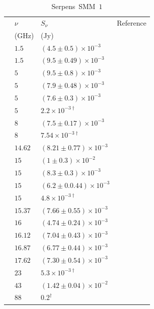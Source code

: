 \documentclass[9pt]{extarticle}   	%
\begin{document}
\begin{table}
\caption{Serpens~SMM~$1$}
\begin{center}
\begin{tabular}{llll}
\hline
 & $\nu$ & $S_\nu$ & Reference\\
 & (GHz) & (Jy) & \\
\hline
 & $1.5$ & $(4.5\pm0.5)\times10^{-3}$ & \citet{1998AJ....115.1693C}\\
 & $1.5$ & $(9.5\pm0.49)\times10^{-3}$ & \citet{1993ApJ...415..191C}\\
 & $5$ & $(9.5\pm0.8)\times10^{-3}$ & \citet{1986ApJ...303..683S}\\
 & $5$ & $(7.9\pm0.48)\times10^{-3}$ & \citet{1989ApJ...346L..85R}\\
 & $5$ & $(7.6\pm0.3)\times10^{-3}$ & \citet{1993ApJ...415..191C}\\
 & $5$ & $2.2\times10^{-3\dag}$ & \citet{1994ApJ...424..222M}\\
 & $8$ & $(7.5\pm0.17)\times10^{-3}$ & \citet{1993ApJ...415..191C}\\
 & $8$ & $7.54\times10^{-3\dag}$ & \citet{2005AJ....130..643E}\\
 & $14.62$ & $(8.21\pm0.77)\times10^{-3}$ & \citet{2012MNRAS.423.1089A}\\
 & $15$ & $(1\pm0.3)\times10^{-2}$ & \citet{1986ApJ...303..683S}\\
 & $15$ & $(8.3\pm0.3)\times10^{-3}$ & \citet{1993ApJ...415..191C}\\
 & $15$ & $(6.2\pm0.0.44)\times10^{-3}$ & \citet{1989ApJ...346L..85R}\\
 & $15$ & $4.8\times10^{-3\dag}$ & \citet{1994ApJ...424..222M}\\
 & $15.37$ & $(7.66\pm0.55)\times10^{-3}$ & \citet{2012MNRAS.423.1089A}\\
 & $16$ & $(4.74\pm0.24)\times10^{-3}$ & \citet{2012MNRAS.420.1019A}\\
 & $16.12$ & $(7.04\pm0.43)\times10^{-3}$ & \citet{2012MNRAS.423.1089A}\\
 & $16.87$ & $(6.77\pm0.44)\times10^{-3}$ & \citet{2012MNRAS.423.1089A}\\
 & $17.62$ & $(7.30\pm0.54)\times10^{-3}$ & \citet{2012MNRAS.423.1089A}\\
 & $23$ & $5.3\times10^{-3\dag}$ & \citet{1994ApJ...424..222M}\\
 & $43$ & $(1.42\pm0.04)\times10^{-2}$ & \citet{2009ApJ...705.1730C}\\
 & $88$ & $0.2^{\dag}$ & \citet{1999ApJ...513..350H}\\

\end{tabular}
\end{center}
\end{table}
\end{document}
